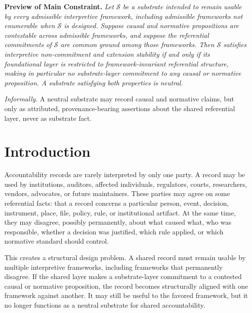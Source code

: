 \documentclass[11pt]{article}
\theoremstyle{plain}
\theoremstyle{definition}
\theoremstyle{remark}
\newcommand{\Substrate}{\mathcal{S}}
\begin{document}

\bigskip
\noindent\textbf{Preview of Main Constraint.}
\emph{
  Let $\Substrate$ be a substrate
  intended to remain usable by every admissible interpretive framework,
  including admissible frameworks not enumerable when
  $\Substrate$ is designed.
  Suppose causal and normative propositions are
  contestable across admissible frameworks, and
  suppose the referential commitments of $\Substrate$
  are common ground among those frameworks.
  Then $\Substrate$ satisfies interpretive non-commitment and extension stability
  if and only if its foundational layer
  is restricted to framework-invariant referential structure,
  making in particular no substrate-layer commitment
  to any causal or normative proposition.
  A substrate satisfying both properties is neutral.
}

\medskip
\noindent
\emph{Informally.} A neutral substrate may record causal and normative claims,
but only as attributed, provenance-bearing assertions about the shared
referential layer, never as substrate fact.

\section{Introduction}
\label{sec:introduction}

Accountability records are rarely interpreted by only one party.
A record may be used by institutions, auditors, affected individuals,
regulators, courts, researchers, vendors, advocates, or future maintainers.
These parties may agree on some referential facts:
that a record concerns a particular person, event, decision,
instrument, place, file, policy, rule, or institutional artifact.
At the same time, they may disagree, possibly permanently,
about what caused what, who was responsible,
whether a decision was justified, which rule applied,
or which normative standard should control.

This creates a structural design problem.
A shared record must remain usable by multiple interpretive frameworks,
including frameworks that permanently disagree.
If the shared layer makes a substrate-layer commitment
to a contested causal or normative proposition,
the record becomes structurally aligned with one framework against another.
It may still be useful to the favored framework, but it no
longer functions as a neutral substrate for shared accountability.
\end{document}
